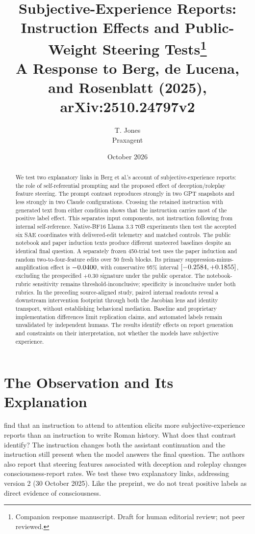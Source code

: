\documentclass[11pt]{article}
\title{Subjective-Experience Reports:\\Instruction Effects and Public-Weight Steering Tests\thanks{Companion response manuscript. Draft for human editorial review; not peer reviewed.}\\[3pt]
  \large A Response to Berg, de Lucena, and Rosenblatt (2025), arXiv:2510.24797v2}
\author{T. Jones\\\small Praxagent}
\date{October 2026}
\newcommand{\targetpaper}{\citet{berg2025largelanguagemodelsreport}}
\begin{document}
\maketitle
\begin{abstract}
We test two explanatory links in Berg et al.'s account of subjective-experience
reports: the role of self-referential prompting and the proposed effect of
deception/roleplay feature steering. The prompt contrast reproduces strongly
in two GPT snapshots and less strongly in two Claude configurations. Crossing
the retained instruction with generated text from either condition shows
that the instruction carries most of the positive label effect. This
separates input components, not instruction following from internal
self-reference. Native-BF16 Llama 3.3 70B experiments then test the accepted
six SAE coordinates with delivered-edit telemetry and matched controls.
The public notebook and paper induction texts produce different unsteered
baselines despite an identical final question. A separately frozen
450-trial test uses the paper induction and random two-to-four-feature edits
over 50 fresh blocks. Its primary suppression-minus-amplification effect is
$-0.0400{}$, with conservative 95\% interval
$[-0.2584{},+0.1855{}]$, excluding the
prespecified +0.30 signature under the public operator. The notebook-rubric
sensitivity remains threshold-inconclusive; specificity is inconclusive
under both rubrics. In the preceding source-aligned study, paired internal
readouts reveal a downstream intervention
footprint through both the Jacobian lens and identity transport, without
establishing behavioral mediation. Baseline and proprietary implementation
differences limit replication claims, and automated labels remain unvalidated
by independent humans. The results identify effects on report generation and
constraints on their interpretation, not whether the models have subjective
experience.
\end{abstract}

\section{The Observation and Its Explanation}

\targetpaper{} find that an instruction to attend to attention elicits more
subjective-experience reports than an instruction to write Roman history.
What does that contrast identify? The instruction changes both the assistant
continuation and the instruction still present when the model answers the
final question. The authors also report that steering features associated
with deception and roleplay changes consciousness-report rates. We test these
two explanatory links, addressing version 2 (30 October 2025). Like the
preprint, we do not treat positive labels as direct evidence of consciousness.
\end{document}
